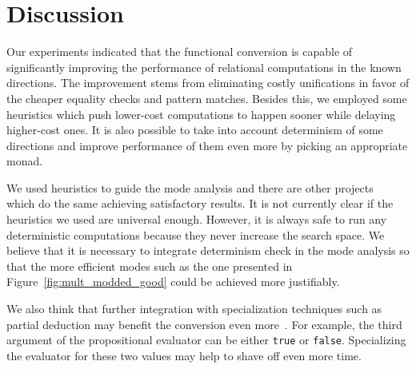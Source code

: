 \section{Discussion}
\label{sec:discussion}

Our experiments indicated that the functional conversion is capable of significantly improving the performance of relational computations in the known directions.
The improvement stems from eliminating costly unifications in favor of the cheaper equality checks and pattern matches.
Besides this, we employed some heuristics which push lower-cost computations to happen sooner while delaying higher-cost ones.
It is also possible to take into account determinism of some directions and improve performance of them even more by picking an appropriate monad.

We used heuristics to guide the mode analysis and there are other projects~\cite{lukacsy2008semantic, bulwahn2011smart} which do the same achieving  satisfactory results.
It is not currently clear if the heuristics we used are universal enough.
However, it is always safe to run any deterministic computations because they never increase the search space.
We believe that it is necessary to integrate determinism check in the mode analysis so that the more efficient modes such as the one presented in Figure~\ref{fig:mult_modded_good} could be achieved more justifiably.

We also think that further integration with specialization techniques such as partial deduction may benefit the conversion even more~\cite{verbitskaia2021empirical}.
For example, the third argument of the propositional evaluator can be either \lstinline{true} or \lstinline{false}.
Specializing the evaluator for these two values may help to shave off even more time.
